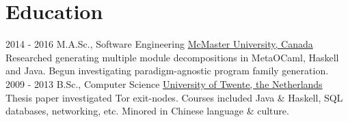 \documentclass[letterpaper]{twentysecondcv} %
\begin{document}
\makeprofile %



\section{Education}
\vspace{-0.5em}

\begin{twenty} %
  \twentyitem
    {2014 - 2016}
    {}
    {M.A.Sc., Software Engineering}%
    {\href{https://www.mcmaster.ca/}{McMaster University, Canada}}
    {}
    {Researched generating multiple module decompositions in MetaOCaml, Haskell and Java. Begun investigating paradigm-agnostic program family generation.}
    \\
  \twentyitem
    {2009 - 2013}
    {}
    {B.Sc., Computer Science}%
    {\href{https://www.utwente.nl/}{University of Twente, the Netherlands}}
    {}
    {Thesis paper investigated Tor exit-nodes. Courses included Java \& Haskell, SQL databases, networking, etc. Minored in Chinese language \& culture.}
\end{twenty}


\vspace{-0.5em}
\end{document}
